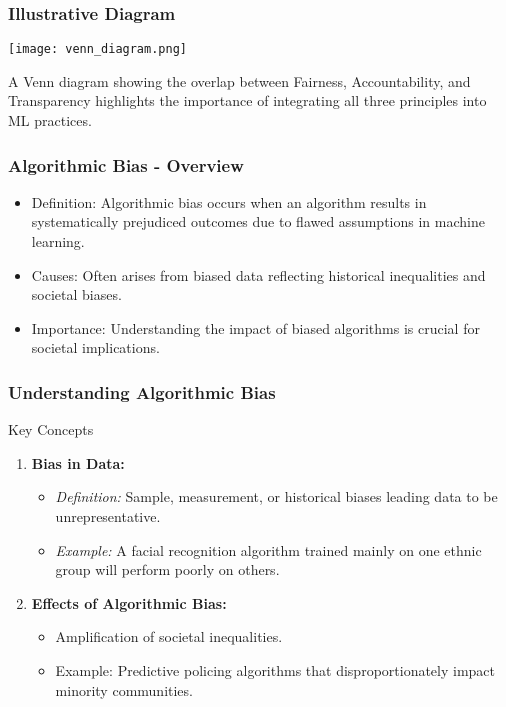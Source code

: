 \documentclass{beamer}
\begin{document}
\begin{frame}[fragile]
    \frametitle{Illustrative Diagram}
    \begin{center}
        \texttt{[image: venn\_diagram.png]} %
    \end{center}
    A Venn diagram showing the overlap between Fairness, Accountability, and Transparency highlights the importance of integrating all three principles into ML practices.
\end{frame}

\begin{frame}[fragile]
    \frametitle{Algorithmic Bias - Overview}
    \begin{itemize}
        \item Definition: Algorithmic bias occurs when an algorithm results in systematically prejudiced outcomes due to flawed assumptions in machine learning.
        \item Causes: Often arises from biased data reflecting historical inequalities and societal biases.
        \item Importance: Understanding the impact of biased algorithms is crucial for societal implications.
    \end{itemize}
\end{frame}

\begin{frame}[fragile]
    \frametitle{Understanding Algorithmic Bias}
    \begin{block}{Key Concepts}
        \begin{enumerate}
            \item \textbf{Bias in Data:}
            \begin{itemize}
                \item \textit{Definition:} Sample, measurement, or historical biases leading data to be unrepresentative.
                \item \textit{Example:} A facial recognition algorithm trained mainly on one ethnic group will perform poorly on others.
            \end{itemize}
            
            \item \textbf{Effects of Algorithmic Bias:}
            \begin{itemize}
                \item Amplification of societal inequalities.
                \item Example: Predictive policing algorithms that disproportionately impact minority communities.
            \end{itemize}
        \end{enumerate}
    \end{block}
\end{frame}
\end{document}
